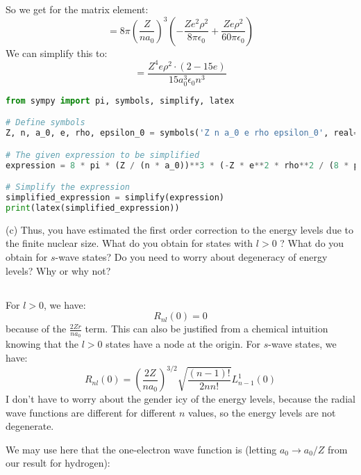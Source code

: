 \documentclass[12pt]{article}
\begin{document}
So we get for the matrix element:
\begin{equation}
  = 8 \pi  \left(\frac{Z}{n a_{0}}\right)^{3} \left(-\frac{Ze^2\rho^2}{8\pi\epsilon_0} + \frac{Ze\rho^2}{60\pi\epsilon_0} \right)
\end{equation}
We can simplify this to:
\begin{equation}
  = \frac{Z^{4} e \rho^{2} \cdot \left(2 - 15 e\right)}{15 a_{0}^{3} \epsilon_{0} n^{3}}
\end{equation}
\begin{lstlisting}[language=Python]
from sympy import pi, symbols, simplify, latex

# Define symbols
Z, n, a_0, e, rho, epsilon_0 = symbols('Z n a_0 e rho epsilon_0', real=True, positive=True)

# The given expression to be simplified
expression = 8 * pi * (Z / (n * a_0))**3 * (-Z * e**2 * rho**2 / (8 * pi * epsilon_0) + Z * e * rho**2 / (60 * pi * epsilon_0))

# Simplify the expression
simplified_expression = simplify(expression)
print(latex(simplified_expression))
\end{lstlisting}
(c) Thus, you have estimated the first order correction to the energy levels due to the finite nuclear size. What do you obtain for states with $l>0$ ? What do you obtain for $s$-wave states? Do you need to worry about degeneracy of energy levels? Why or why not?
\subsection{}
For $l > 0$, we have:
\begin{equation}
  R_{nl}(0) = 0
\end{equation}
because of the $\frac{2 Z r}{n a_{0}}$ term. This can also be justified from a chemical intuition knowing that the $l > 0$ states have a node at the origin. For $s$-wave states, we have:
\begin{equation}
  R_{nl}(0) = \left(\frac{2 Z}{n a_{0}}\right)^{3 / 2} \sqrt{\frac{(n-1) !}{2 nn !}} L_{n-1}^{1}\left(0\right)
\end{equation}
I don't have to worry about the gender icy of the energy levels, because the radial wave functions are different for different $n$ values, so the energy levels are not degenerate.


We may use here that the one-electron wave function is (letting $a_{0} \rightarrow a_{0} / Z$ from our result for hydrogen):
\end{document}

